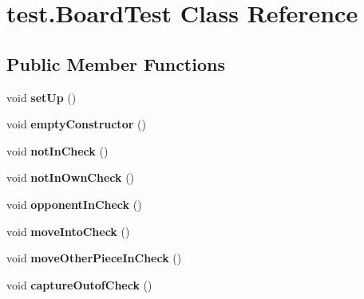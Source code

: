 \hypertarget{classtest_1_1BoardTest}{\section{test.\-Board\-Test Class Reference}
\label{classtest_1_1BoardTest}
}
\subsection*{Public Member Functions}
\begin{DoxyCompactItemize}
\item 
\hypertarget{classtest_1_1BoardTest_ae6d37c5be726446c186c70b1efc00916}{void {\bfseries set\-Up} ()}\label{classtest_1_1BoardTest_ae6d37c5be726446c186c70b1efc00916}

\item 
\hypertarget{classtest_1_1BoardTest_a3ec0792fa88545e83de0f9319875a378}{void {\bfseries empty\-Constructor} ()}\label{classtest_1_1BoardTest_a3ec0792fa88545e83de0f9319875a378}

\item 
\hypertarget{classtest_1_1BoardTest_afc3c18de1c56b9f37fce53519933eaeb}{void {\bfseries not\-In\-Check} ()}\label{classtest_1_1BoardTest_afc3c18de1c56b9f37fce53519933eaeb}

\item 
\hypertarget{classtest_1_1BoardTest_a735d51ed62a3173efdee865248a5767c}{void {\bfseries not\-In\-Own\-Check} ()}\label{classtest_1_1BoardTest_a735d51ed62a3173efdee865248a5767c}

\item 
\hypertarget{classtest_1_1BoardTest_a895ee333ab28bf431c0b4d31924cc274}{void {\bfseries opponent\-In\-Check} ()}\label{classtest_1_1BoardTest_a895ee333ab28bf431c0b4d31924cc274}

\item 
\hypertarget{classtest_1_1BoardTest_adb9fdfc2c872dbdad738bead1e79c03e}{void {\bfseries move\-Into\-Check} ()}\label{classtest_1_1BoardTest_adb9fdfc2c872dbdad738bead1e79c03e}

\item 
\hypertarget{classtest_1_1BoardTest_a8e0afe9c075e09d51cc21405a932417c}{void {\bfseries move\-Other\-Piece\-In\-Check} ()}\label{classtest_1_1BoardTest_a8e0afe9c075e09d51cc21405a932417c}

\item 
\hypertarget{classtest_1_1BoardTest_ada6bc8c11890b19b6a9386d180304d85}{void {\bfseries capture\-Outof\-Check} ()}\label{classtest_1_1BoardTest_ada6bc8c11890b19b6a9386d180304d85}


\end{DoxyCompactItemize}

